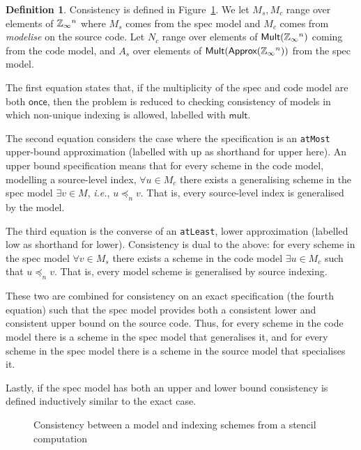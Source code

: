 \documentclass[9pt]{sigplanconf}
\newcounter{block}
\theoremstyle{definition}
\newtheorem{definition}[block]{Definition}
\newcommand{\ie}{\emph{i.e.}}
\newcommand{\term}[1]{\texttt{#1}}
\begin{document}
\begin{definition}
Consistency is defined in Figure~\ref{fig:consistency}. We let
$M_s, M_c$ range over elements of $\mathbb{Z}_\infty{}^n$ where $M_s$ comes
from the spec model and $M_c$ comes from \textit{modelise} on the
source code. Let $N_c$ range over elements of
$\textsf{Mult}(\mathbb{Z}_\infty{}^n)$ coming from the code model, and $A_s$
over elements of $\textsf{Mult}(\textsf{Approx}(\mathbb{Z}_\infty{}^n))$ from the spec model.

The first equation states that, if the multiplicity of the spec and code
model are both $\mathsf{once}$, then the problem is reduced to checking consistency of
models in which non-unique indexing is allowed, labelled with
$\mathsf{mult}$. 

The second equation considers the case where the specification is
an \term{atMost} upper-bound approximation (labelled with \textsf{up}
as shorthand for \textsf{upper} here). 
An upper bound specification means that for every scheme in the code
model, modelling a source-level index, $\forall u \in M_c$ there exists
a generalising scheme in the spec model $\exists v \in M$, \ie{}, $u
\preceq_n v$. That is, every source-level index is generalised by the model.

The third equation is the converse of an \term{atLeast},
lower approximation (labelled \textsf{low} as shorthand for
\textsf{lower}). Consistency is dual to the above: 
for every scheme in the spec model $\forall v \in M_s$ there
exists a scheme in the code model $\exists u \in M_c$ such that $u
\preceq_n v$. That is, every model scheme is generalised by source indexing.

These two are combined for consistency on an \textsf{exact}
specification (the fourth equation) such that the spec model
provides both a consistent lower and consistent upper bound on
the source code. Thus, for every scheme in the code model there
is a scheme in the spec model that generalises it, and for every
scheme in the spec model there is a scheme in the source model that
specialises it.  

Lastly, if the spec model has both an upper and lower bound
consistency is defined inductively similar to the \textsf{exact} case.
\end{definition}

\begin{figure}

\caption{Consistency between a model and indexing schemes from a stencil computation}
\label{fig:consistency}
\vspace{-0.9em}
\end{figure}
\end{document}
